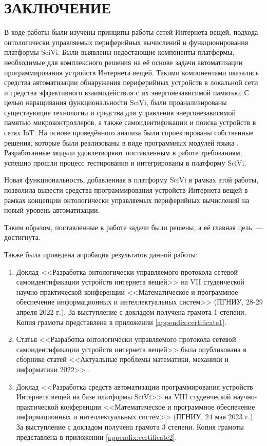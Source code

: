 \chapter*{ЗАКЛЮЧЕНИЕ}

В ходе работы были изучены принципы работы сетей Интернета вещей, подхода онтологически управляемых периферийных вычислений и функционирования платформы SciVi. Были выявлены недостающие компоненты платформы, необходимые для комплексного решения на её основе задачи автоматизации программирования устройств Интернета вещей. Такими компонентами оказались средства автоматизации обнаружения периферийных устройств в локальной сети и средства эффективного взаимодействия с их энергонезависимой памятью.
С целью наращивания функциональности SciVi, были проанализированы существующие технологии и средства для управления энергонезависимой памятью микроконтроллеров, а также самоидентификации и поиска устройств в сетях IoT.
На основе проведённого анализа были спроектированы собственные решения, которые были реализованы в виде программных модулей языка \CPP.
Разработанные модули удовлетворяют поставленным в работе требованиям, успешно прошли процесс тестирования и интегрированы в платформу SciVi.

Новая функциональность, добавленная в платформу SciVi в рамках этой работы, позволила вывести средства программирования устройств Интернета вещей в рамках концепции онтологически управляемых периферийных вычислений на новый уровень автоматизации.

Таким образом, поставленные в работе задачи были решены, а её главная цель~--- достигнута.

Также была проведена апробация результатов данной работы:
\begin{enumerate}
	\item Доклад <<Разработка онтологически управляемого протокола сетевой самоидентификации устройств интернета вещей>> на VII студенческой научно-практической конференции <<Математическое и программное обеспечение информационных и интеллектуальных систем>> (ПГНИУ, 28-29 апреля 2022 г.).
	За выступление с докладом получена грамота 1 степени. Копия грамоты представлена в приложении \ref{appendix:certificate1}.
	\item Статья <<Разработка онтологически управляемого протокола сетевой самоидентификации устройств интернета вещей>> была опубликована в сборнике статей <<Актуальные проблемы математики, механики и информатики 2022>> \cite{incollection:odec-self-id-protocol}.
	\item Доклад <<Разработка средств автоматизации программирования устройств Интернета вещей на базе платформы SciVi>> на VIII студенческой научно-практической конференции <<Математическое и программное обеспечение информационных и интеллектуальных систем>> (ПГНИУ, 24 мая 2023 г.).
	За выступление с докладом получена грамота 3 степени. Копия грамоты представлена в приложении \ref{appendix:certificate2}.
\end{enumerate}
